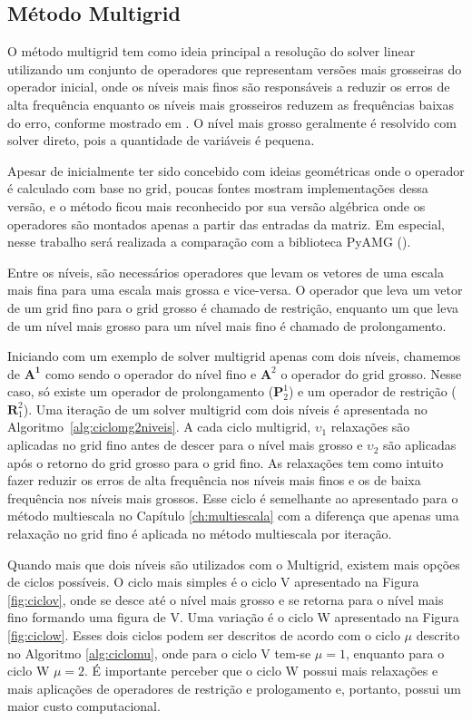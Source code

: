 \subsection{Método Multigrid}

O método multigrid tem como ideia principal a resolução do solver linear utilizando um conjunto de operadores que representam versões mais grosseiras do operador inicial, onde os níveis mais finos são responsáveis a reduzir os erros de alta frequência enquanto os níveis mais grosseiros reduzem as frequências baixas do erro, conforme mostrado em \citet{multigridtutorial}. O nível mais grosso geralmente é resolvido com solver direto, pois a quantidade de variáveis é pequena. 

Apesar de inicialmente ter sido concebido com ideias geométricas onde o operador é calculado com base no grid, poucas fontes mostram implementações dessa versão, e o método ficou mais reconhecido por sua versão algébrica onde os operadores são montados apenas a partir das entradas da matriz. Em especial, nesse trabalho será realizada a comparação com a biblioteca PyAMG (\citet{OlSc2018}).


Entre os níveis, são necessários operadores que levam os vetores de uma escala mais fina para uma escala mais grossa e vice-versa. O operador que leva um vetor de um grid fino para o grid grosso é chamado de restrição, enquanto um que leva de um nível mais grosso para um nível mais fino é chamado de prolongamento. 


Iniciando com um exemplo de solver multigrid apenas com dois níveis, chamemos de $\mathbf{A^1}$ como sendo o operador do nível fino e $\mathbf{A}^2$ o operador do grid grosso. Nesse caso, só existe um operador de prolongamento ($\mathbf{P}_2^1$) e um operador de restrição ($\mathbf{R}^2_1$). Uma iteração de um solver multigrid com dois níveis é apresentada no Algoritmo~\ref{alg:ciclomg2niveis}. A cada ciclo multigrid, $\upsilon_1$ relaxações são aplicadas no grid fino antes de descer para o nível mais grosso e $\upsilon_2$ são aplicadas após o retorno do grid grosso para o grid fino. As relaxações tem como intuito fazer reduzir os erros de alta frequência nos níveis mais finos e os de baixa frequência nos níveis mais grossos. Esse ciclo é semelhante ao apresentado para o método multiescala no Capítulo \ref{ch:multiescala} com a diferença que apenas uma relaxação no grid fino é aplicada no método multiescala por iteração.


Quando mais que dois níveis são utilizados com o Multigrid, existem mais opções de ciclos possíveis. O ciclo mais simples é o ciclo V apresentado na Figura \ref{fig:ciclov}, onde se desce até o nível mais grosso e se retorna para o nível mais fino formando uma figura de V. Uma variação é o ciclo W apresentado na Figura \ref{fig:ciclow}. Esses dois ciclos podem ser descritos de acordo com o ciclo $\mu$ descrito no Algoritmo \ref{alg:ciclomu}, onde para o ciclo V tem-se $\mu = 1$, enquanto para o ciclo W $\mu = 2$. É importante perceber que o ciclo W possui mais relaxações e mais aplicações de operadores de restrição e prologamento e, portanto, possui um maior custo computacional.

